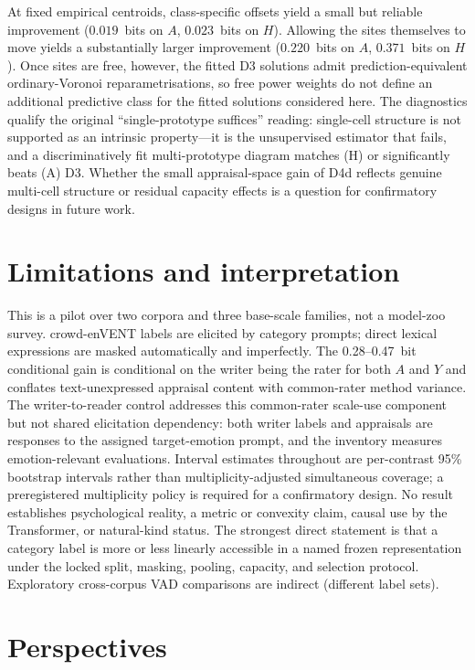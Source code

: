 \documentclass[11pt]{article}
\begin{document}
At fixed empirical centroids, class-specific offsets yield a small but reliable improvement ($0.019$~bits on $A$, $0.023$~bits on $H$). Allowing the sites themselves to move yields a substantially larger improvement ($0.220$~bits on $A$, $0.371$~bits on $H$). Once sites are free, however, the fitted D3 solutions admit prediction-equivalent ordinary-Voronoi reparametrisations, so free power weights do not define an additional predictive class for the fitted solutions considered here. The diagnostics qualify the original ``single-prototype suffices'' reading: single-cell structure is not supported as an intrinsic property---it is the unsupervised estimator that fails, and a discriminatively fit multi-prototype diagram matches (H) or significantly beats (A) D3. Whether the small appraisal-space gain of D4d reflects genuine multi-cell structure or residual capacity effects is a question for confirmatory designs in future work.

\section{Limitations and interpretation}

This is a pilot over two corpora and three base-scale families, not a model-zoo survey. crowd-enVENT labels are elicited by category prompts; direct lexical expressions are masked automatically and imperfectly. The 0.28--0.47~bit conditional gain is conditional on the writer being the rater for both $A$ and $Y$ and conflates text-unexpressed appraisal content with common-rater method variance. The writer-to-reader control addresses this common-rater scale-use component but not shared elicitation dependency: both writer labels and appraisals are responses to the assigned target-emotion prompt, and the inventory measures emotion-relevant evaluations. Interval estimates throughout are per-contrast 95\% bootstrap intervals rather than multiplicity-adjusted simultaneous coverage; a preregistered multiplicity policy is required for a confirmatory design. No result establishes psychological reality, a metric or convexity claim, causal use by the Transformer, or natural-kind status. The strongest direct statement is that a category label is more or less linearly accessible in a named frozen representation under the locked split, masking, pooling, capacity, and selection protocol. Exploratory cross-corpus VAD comparisons are indirect (different label sets).

\section{Perspectives}
\end{document}
